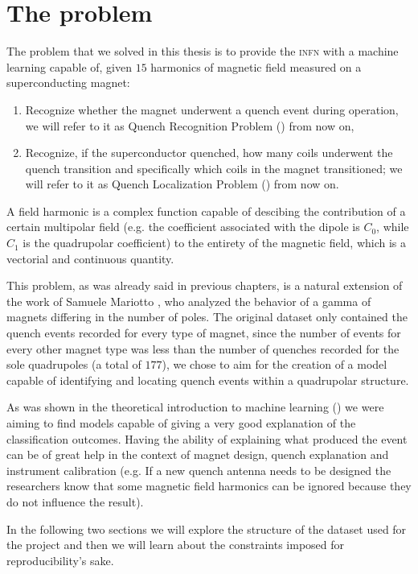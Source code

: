 \chapter{The problem}
\label{chp:problem}
The problem that we solved in this thesis is to provide the \textsc{infn} with a machine learning
capable of, given $15$ harmonics of magnetic field measured on a superconducting magnet:
\begin{enumerate}
	\item Recognize whether the magnet underwent a quench event during operation, we will refer
	      to it as Quench Recognition Problem (\qrp) from now on,
	\item Recognize, if the superconductor quenched, how many coils underwent the quench
	      transition and specifically which coils in the magnet transitioned; we will refer to
	      it as Quench Localization Problem (\qlp) from now on.
\end{enumerate}
A field harmonic is a complex function capable of descibing the contribution of a certain multipolar
field (e.g. the coefficient associated with the dipole is $C_0$, while $C_1$ is the quadrupolar
coefficient) to the entirety of the magnetic field, which is a vectorial and continuous quantity.

This problem, as was already said in previous chapters, is a natural extension of the work of
Samuele Mariotto \cite{mariotto2022}\cite{mariotto2022-generic}, who analyzed the behavior of
a gamma of magnets differing in the number of poles. The original dataset only contained the quench
events recorded for every type of magnet, since the number of events for every other magnet type was
less than the number of quenches recorded for the sole quadrupoles (a total of $177$), we chose to
aim for the creation of a model capable of identifying and locating quench events within a
quadrupolar structure.

As was shown in the theoretical introduction to machine learning () we were aiming to
find models capable of giving a very good explanation of the classification outcomes. Having the
ability of explaining what produced the event can be of great help in the context of magnet design,
quench explanation and instrument calibration (e.g. If a new quench antenna needs to be designed the
researchers know that some magnetic field harmonics can be ignored because they do not influence the
result).

In the following two sections we will explore the structure of the dataset used for the project and
then we will learn about the constraints imposed for reproducibility's sake.


